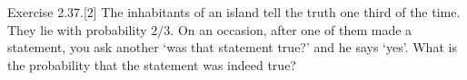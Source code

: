 \item
	Exercise 2.37.[2] The inhabitants of an island tell the truth one third of the
	time. They lie with probability $2/3$.
	On an occasion, after one of them made a statement, you ask another
	`was that statement true?' and he says `yes'.
	What is the probability that the statement was indeed true?
